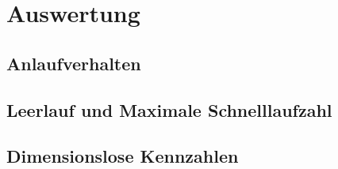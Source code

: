 \section{Auswertung}
\label{sec:Auswertung}
\subsection{Anlaufverhalten}








\subsection{Leerlauf und Maximale Schnelllaufzahl}








\subsection{Dimensionslose Kennzahlen}